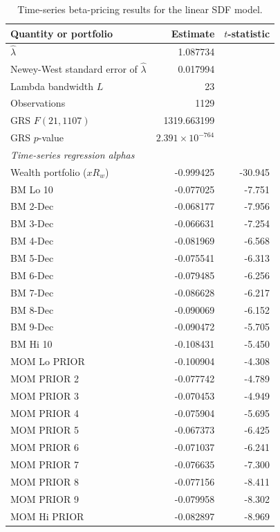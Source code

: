 \begin{table}[htbp]
\centering
\small
\caption{Time-series beta-pricing results for the linear SDF model.}
\label{tab:q4d-results}
\begin{tabular}{lrr}
\hline
Quantity or portfolio & Estimate & $t$-statistic \\
\hline
$\widehat{\lambda}$ & 1.087734 & \\
Newey-West standard error of $\widehat{\lambda}$ & 0.017994 & \\
Lambda bandwidth $L$ & 23 & \\
Observations & 1129 & \\
GRS $F(21,1107)$ & 1319.663199 & \\
GRS $p$-value & $2.391\times 10^{-764}$ & \\
\hline
\multicolumn{3}{l}{\textit{Time-series regression alphas}} \\
\hline
Wealth portfolio ($xR_w$) & -0.999425 & -30.945 \\
BM Lo 10 & -0.077025 & -7.751 \\
BM 2-Dec & -0.068177 & -7.956 \\
BM 3-Dec & -0.066631 & -7.254 \\
BM 4-Dec & -0.081969 & -6.568 \\
BM 5-Dec & -0.075541 & -6.313 \\
BM 6-Dec & -0.079485 & -6.256 \\
BM 7-Dec & -0.086628 & -6.217 \\
BM 8-Dec & -0.090069 & -6.152 \\
BM 9-Dec & -0.090472 & -5.705 \\
BM Hi 10 & -0.108431 & -5.450 \\
MOM Lo PRIOR & -0.100904 & -4.308 \\
MOM PRIOR 2 & -0.077742 & -4.789 \\
MOM PRIOR 3 & -0.070453 & -4.949 \\
MOM PRIOR 4 & -0.075904 & -5.695 \\
MOM PRIOR 5 & -0.067373 & -6.425 \\
MOM PRIOR 6 & -0.071037 & -6.241 \\
MOM PRIOR 7 & -0.076635 & -7.300 \\
MOM PRIOR 8 & -0.077156 & -8.411 \\
MOM PRIOR 9 & -0.079958 & -8.302 \\
MOM Hi PRIOR & -0.082897 & -8.969 \\
\hline
\end{tabular}
\end{table}
